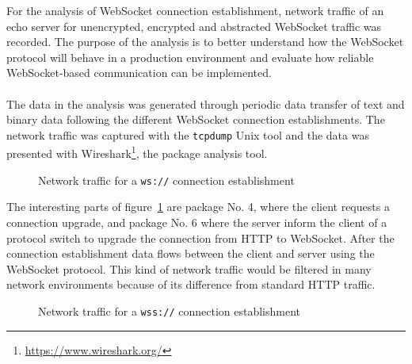 For the analysis of WebSocket connection establishment, network traffic of an echo server for unencrypted, encrypted and abstracted WebSocket traffic was recorded. The purpose of the analysis is to better understand how the WebSocket protocol will behave in a production environment and evaluate how reliable WebSocket-based communication can be implemented.
\\ \\
The data in the analysis was generated through periodic data transfer of text and binary data following the different WebSocket connection establishments. The network traffic was captured with the \texttt{tcpdump} Unix tool and the data was presented with Wireshark\footnote{\url{https://www.wireshark.org/}}, the package analysis tool.
\\
\begin{figure}[h!]
	\centering
	\caption{Network traffic for a \texttt{ws://} connection establishment}
	\label{fig:wsTraffic}
\end{figure}

\noindent
The interesting parts of figure~\ref{fig:wsTraffic} are package No. 4, where the client requests a connection upgrade, and package No. 6 where the server inform the client of a protocol switch to upgrade the connection from HTTP to WebSocket. After the connection establishment data flows between the client and server using the WebSocket protocol. This kind of network traffic would be filtered in many network environments because of its difference from standard HTTP traffic.
\\
\begin{figure}[h!]
	\centering
	\caption{Network traffic for a \texttt{wss://} connection establishment}
	\label{fig:wssTraffic}
\end{figure}

